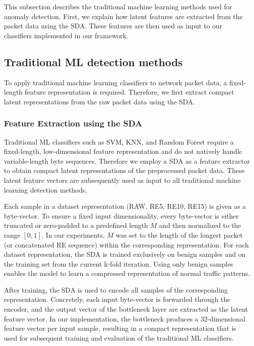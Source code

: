 This subsection describes the traditional machine learning methods used for anomaly detection. 
First, we explain how latent features are extracted from the packet data using the \ac{SDA}. These features are then used as input to our classifiers implemented in our framework.

\subsection{Traditional \ac{ML} detection methods}


To apply traditional machine learning classifiers to network packet data, a fixed-length feature 
representation is required. Therefore, we first extract compact latent representations from the 
raw packet data using the \ac{SDA}.


\subsubsection{Feature Extraction using the \ac{SDA}}
Traditional ML classifiers such as \ac{SVM}, \ac{KNN}, and Random Forest require a fixed-length, low-dimensional feature representation and do not natively handle variable-length byte sequences. Therefore we employ a \ac{SDA} as a feature extractor to obtain compact latent representations of the preprocessed
packet data. These latent feature vectors are subsequently used as input to all traditional
machine learning detection methods.

Each sample in a dataset representation (RAW, RE5, RE10, RE15) is given as a byte-vector.
To ensure a fixed input dimensionality, every byte-vector is either truncated or zero-padded
to a predefined length $M$ and then normalized to the range $[0,1]$. In our experiments,
$M$ was set to the length of the longest packet (or concatenated RE sequence) within the
corresponding representation.
For each dataset representation, the \ac{SDA} is trained exclusively on benign samples and on the training set from the current k-fold iteration. Using only benign samples enables the
model to learn a compressed representation of normal traffic patterns.

After training, the \ac{SDA} is used to encode all samples of the corresponding representation.
Concretely, each input byte-vector is forwarded through the encoder, and the output vector of
the bottleneck layer are extracted as the latent feature vector. In our implementation, the
bottleneck produces a 32-dimensional feature vector per input sample, resulting in a compact
representation that is used for subsequent training and evaluation of the traditional ML
classifiers.

